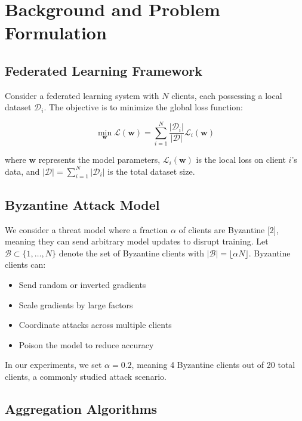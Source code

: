\documentclass[12pt,a4paper,onecolumn]{article}
\begin{document}
\section{Background and Problem Formulation}
\label{sec:background}

\subsection{Federated Learning Framework}

Consider a federated learning system with $N$ clients, each possessing a local dataset $\mathcal{D}_i$. The objective is to minimize the global loss function:

\begin{equation}
\min_{\mathbf{w}} \mathcal{L}(\mathbf{w}) = \sum_{i=1}^{N} \frac{|\mathcal{D}_i|}{|\mathcal{D}|} \mathcal{L}_i(\mathbf{w})
\label{eq:global_loss}
\end{equation}

where $\mathbf{w}$ represents the model parameters, $\mathcal{L}_i(\mathbf{w})$ is the local loss on client $i$'s data, and $|\mathcal{D}| = \sum_{i=1}^{N} |\mathcal{D}_i|$ is the total dataset size.

\subsection{Byzantine Attack Model}

We consider a threat model where a fraction $\alpha$ of clients are Byzantine [2], meaning they can send arbitrary model updates to disrupt training. Let $\mathcal{B} \subset \{1, \ldots, N\}$ denote the set of Byzantine clients with $|\mathcal{B}| = \lfloor \alpha N \rfloor$. Byzantine clients can:

\begin{itemize}
    \item Send random or inverted gradients
    \item Scale gradients by large factors
    \item Coordinate attacks across multiple clients
    \item Poison the model to reduce accuracy
\end{itemize}

In our experiments, we set $\alpha = 0.2$, meaning 4 Byzantine clients out of 20 total clients, a commonly studied attack scenario.

\subsection{Aggregation Algorithms}
\end{document}
